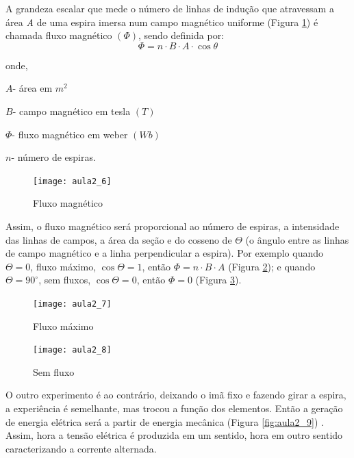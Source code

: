 A grandeza escalar que mede o número de linhas de indução que atravessam
a área \textit{\textcolor{black}{A }}de uma espira imersa num campo
magnético uniforme (Figura \ref{fig:aula2_6}) é chamada fluxo magnético $(\Phi)$, sendo definida
por:
\begin{equation}\label{eq:fluxomag}
\Phi=n\cdot B\cdot A\cdot\cos\theta 
\end{equation}


onde,

$A$- área em $m^{2}$

$B$- campo magnético em tesla $(T)$

$\Phi$- fluxo magnético em weber $(Wb)$

$n$- número de espiras.




\begin{figure}[H]
\begin{centering}
\texttt{[image: aula2\_6]}\protect\caption{\label{fig:aula2_6}Fluxo magnético }
\end{centering}

\end{figure}
Assim, o fluxo magnético será proporcional ao número de espiras, a
intensidade das linhas de campos, a área da seção e do cosseno de $\Theta$
(o ângulo entre as linhas de campo magnético e a linha perpendicular
a espira). 
Por exemplo quando $\Theta=0$, fluxo máximo, $\cos\Theta=1$, então
$\Phi=n\cdot B\cdot A$ (Figura \ref{fig:aula2_7}); e quando $\Theta=90^{\circ}$, sem fluxos, $\cos\Theta=0$, 
então $\Phi=0$ (Figura \ref{fig:aula2_8}).

\begin{figure}[H]
\begin{centering}
\texttt{[image: aula2\_7]}\protect\caption{\label{fig:aula2_7}Fluxo máximo }
\end{centering}

\end{figure}
\begin{figure}[H]
\begin{centering}
\texttt{[image: aula2\_8]}\protect\caption{\label{fig:aula2_8}Sem fluxo }
\end{centering}

\end{figure}

O outro experimento é ao contrário, deixando o imã fixo e fazendo girar
a espira, a experiência é semelhante, mas trocou a função dos elementos.
Então a geração de energia elétrica será a partir de energia mecânica (Figura
\ref{fig:aula2_9}) . Assim, hora a tensão elétrica é produzida em um sentido, hora
em outro sentido caracterizando a corrente alternada.

